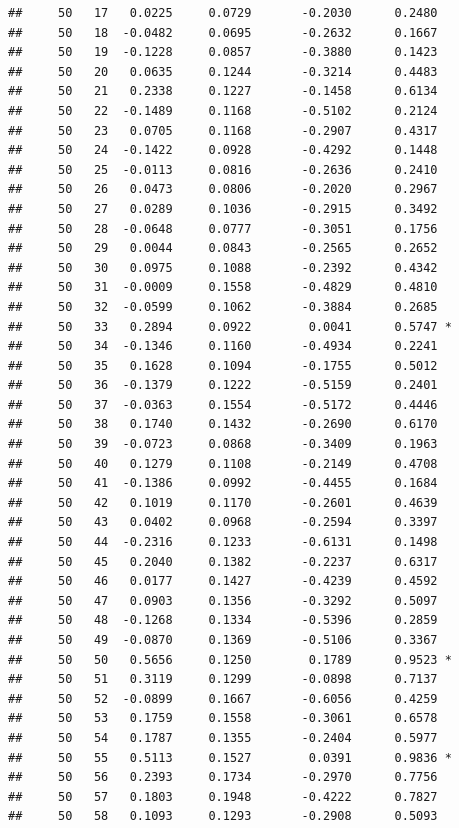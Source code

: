 \documentclass[
]{article}
\begin{document}
\begin{verbatim}
##     50   17   0.0225     0.0729       -0.2030      0.2480  
##     50   18  -0.0482     0.0695       -0.2632      0.1667  
##     50   19  -0.1228     0.0857       -0.3880      0.1423  
##     50   20   0.0635     0.1244       -0.3214      0.4483  
##     50   21   0.2338     0.1227       -0.1458      0.6134  
##     50   22  -0.1489     0.1168       -0.5102      0.2124  
##     50   23   0.0705     0.1168       -0.2907      0.4317  
##     50   24  -0.1422     0.0928       -0.4292      0.1448  
##     50   25  -0.0113     0.0816       -0.2636      0.2410  
##     50   26   0.0473     0.0806       -0.2020      0.2967  
##     50   27   0.0289     0.1036       -0.2915      0.3492  
##     50   28  -0.0648     0.0777       -0.3051      0.1756  
##     50   29   0.0044     0.0843       -0.2565      0.2652  
##     50   30   0.0975     0.1088       -0.2392      0.4342  
##     50   31  -0.0009     0.1558       -0.4829      0.4810  
##     50   32  -0.0599     0.1062       -0.3884      0.2685  
##     50   33   0.2894     0.0922        0.0041      0.5747 *
##     50   34  -0.1346     0.1160       -0.4934      0.2241  
##     50   35   0.1628     0.1094       -0.1755      0.5012  
##     50   36  -0.1379     0.1222       -0.5159      0.2401  
##     50   37  -0.0363     0.1554       -0.5172      0.4446  
##     50   38   0.1740     0.1432       -0.2690      0.6170  
##     50   39  -0.0723     0.0868       -0.3409      0.1963  
##     50   40   0.1279     0.1108       -0.2149      0.4708  
##     50   41  -0.1386     0.0992       -0.4455      0.1684  
##     50   42   0.1019     0.1170       -0.2601      0.4639  
##     50   43   0.0402     0.0968       -0.2594      0.3397  
##     50   44  -0.2316     0.1233       -0.6131      0.1498  
##     50   45   0.2040     0.1382       -0.2237      0.6317  
##     50   46   0.0177     0.1427       -0.4239      0.4592  
##     50   47   0.0903     0.1356       -0.3292      0.5097  
##     50   48  -0.1268     0.1334       -0.5396      0.2859  
##     50   49  -0.0870     0.1369       -0.5106      0.3367  
##     50   50   0.5656     0.1250        0.1789      0.9523 *
##     50   51   0.3119     0.1299       -0.0898      0.7137  
##     50   52  -0.0899     0.1667       -0.6056      0.4259  
##     50   53   0.1759     0.1558       -0.3061      0.6578  
##     50   54   0.1787     0.1355       -0.2404      0.5977  
##     50   55   0.5113     0.1527        0.0391      0.9836 *
##     50   56   0.2393     0.1734       -0.2970      0.7756  
##     50   57   0.1803     0.1948       -0.4222      0.7827  
##     50   58   0.1093     0.1293       -0.2908      0.5093  

\end{verbatim}
\end{document}
